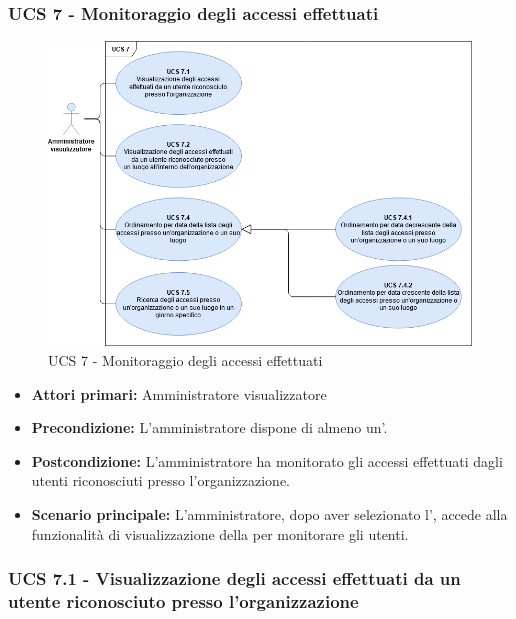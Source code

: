 
\subsubsection{UCS 7 - Monitoraggio degli accessi effettuati}

\begin{figure}[h]
	\centering
	\includegraphics[scale=0.33]{Sezioni/UseCase/Immagini/UCS7.png}
	\caption{UCS 7 - Monitoraggio degli accessi effettuati}
\end{figure}

\begin{itemize}
\item \textbf{Attori primari:} Amministratore visualizzatore
\item \textbf{Precondizione:} L'amministratore dispone di almeno un'.
\item \textbf{Postcondizione:} L'amministratore ha monitorato gli accessi effettuati dagli utenti riconosciuti presso l'organizzazione.
\item \textbf{Scenario principale:} L'amministratore, dopo aver selezionato l', accede alla funzionalità di visualizzazione della  per monitorare gli utenti.
\end{itemize}

\subsubsection{UCS 7.1 - Visualizzazione degli accessi effettuati da un utente riconosciuto presso l'organizzazione}

